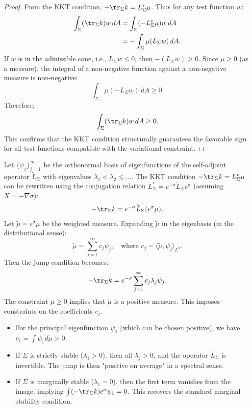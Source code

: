 \begin{proof}
From the KKT condition, $-\tr_\Sigma k = L_\Sigma^* \mu$. Thus for any test function $w$:
\begin{align*}
    \int_\Sigma (\tr_\Sigma k) w \, dA &= \int_\Sigma (-L_\Sigma^* \mu) w \, dA \\
    &= -\int_\Sigma \mu (L_\Sigma w) \, dA.
\end{align*}
If $w$ is in the admissible cone, i.e., $L_\Sigma w \le 0$, then $-(L_\Sigma w) \ge 0$.
Since $\mu \ge 0$ (as a measure), the integral of a non-negative function against a non-negative measure is non-negative:
\[ \int_\Sigma \mu (-L_\Sigma w) \, dA \ge 0. \]
Therefore,
\[ \int_\Sigma (\tr_\Sigma k) w \, dA \ge 0. \]
This confirms that the KKT condition structurally guarantees the favorable sign for all test functions compatible with the variational constraint.
\end{proof}
Let $\{\psi_j\}_{j=1}^\infty$ be the orthonormal basis of eigenfunctions of the self-adjoint operator $\widetilde{L}_\Sigma$ with eigenvalues $\lambda_1 < \lambda_2 \le \dots$.
The KKT condition $-\tr_\Sigma k = L_\Sigma^* \mu$ can be rewritten using the conjugation relation $L_\Sigma^* = e^{-\sigma} \widetilde{L}_\Sigma e^\sigma$ (assuming $X = -\nabla \sigma$):
\begin{equation}
    -\tr_\Sigma k = e^{-\sigma} \widetilde{L}_\Sigma (e^\sigma \mu).
\end{equation}
Let $\tilde{\mu} = e^\sigma \mu$ be the weighted measure. Expanding $\tilde{\mu}$ in the eigenbasis (in the distributional sense):
\begin{equation}
    \tilde{\mu} = \sum_{j=1}^\infty c_j \psi_j, \quad \text{where } c_j = \langle \tilde{\mu}, \psi_j \rangle_{L^2}.
\end{equation}
Then the jump condition becomes:
\begin{equation}
    -\tr_\Sigma k = e^{-\sigma} \sum_{j=1}^\infty c_j \lambda_j \psi_j.
\end{equation}
The constraint $\mu \ge 0$ implies that $\tilde{\mu}$ is a positive measure. This imposes constraints on the coefficients $c_j$.
\begin{itemize}
    \item For the principal eigenfunction $\psi_1$ (which can be chosen positive), we have $c_1 = \int \psi_1 d\tilde{\mu} > 0$.
    \item If $\Sigma$ is strictly stable ($\lambda_1 > 0$), then all $\lambda_j > 0$, and the operator $\widetilde{L}_\Sigma$ is invertible. The jump is then "positive on average" in a spectral sense.
    \item If $\Sigma$ is marginally stable ($\lambda_1 = 0$), then the first term vanishes from the image, implying $\int (-\tr_\Sigma k) e^\sigma \psi_1 = 0$. This recovers the standard marginal stability condition.
\end{itemize}

